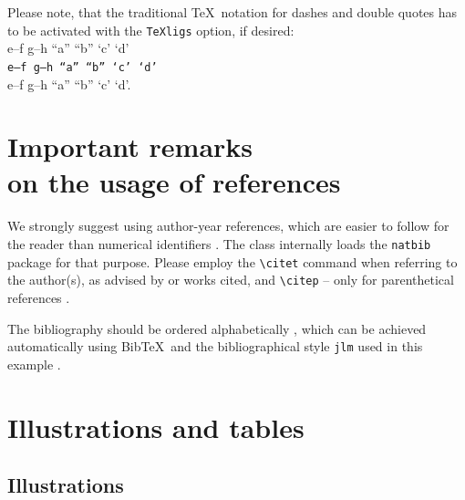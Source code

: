\documentclass[
    anonymous,
]{jlm}
\begin{document}
Please note, that the traditional \TeX\ notation for dashes and double
quotes has to be
activated with the \texttt{TeXligs} option, if desired:\\
e--f g–h ``a'' “b” `c' ‘d’\\
\texttt{e--f g–h ``a'' “b” `c' ‘d’}\\
\textsf{e--f g–h ``a'' “b” `c' ‘d’}.



\section{Important remarks\\ on the usage of references}

We strongly suggest using author-year references, which are easier to
follow for the reader than numerical identifiers
\citep[cf.][]{fifak:sigma_rho}.  The class internally loads the
\texttt{natbib} package for that purpose.  Please employ the
\verb+\citet+ command when referring to the author(s), as advised by
\citet{fifak:sigma_rho} or works cited, and \verb+\citep+ – only for
parenthetical references \citep{fifak:sigma_rho}.


The bibliography should be ordered alphabetically \citep[pp.
20–22]{blarbarucki:blabalyser}, which can be achieved automatically
using Bib\TeX\ and the bibliographical style \texttt{jlm} used in this
example \citep{blarbarucki:blabalyser,fifak:aspects,fifak:blabal}.



\section{Illustrations and tables}


\subsection{Illustrations}
\label{sec:illustrations}
\end{document}
